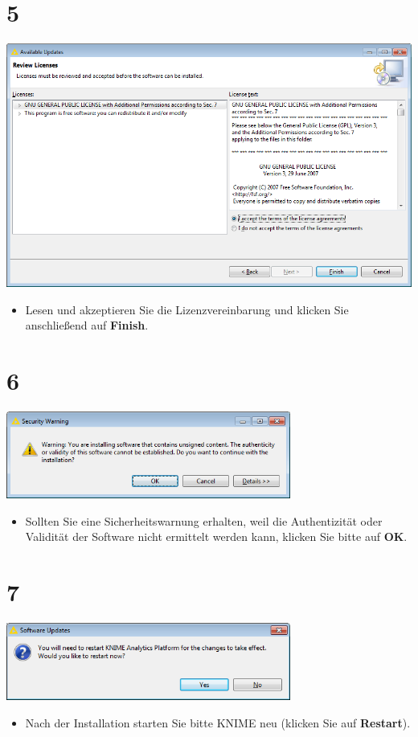 \documentclass{beamer}
\begin{document}
\section{5}
\begin{frame}
	\begin{center}
  		\includegraphics[height=0.6\textheight]{5.png}
	\end{center}
	\begin{itemize}
		\item Lesen und akzeptieren Sie die Lizenzvereinbarung und klicken Sie anschließend auf \textbf{Finish}.
	\end{itemize}
\end{frame}

\section{6}
\begin{frame}
	\begin{center}
  		\includegraphics[width=0.7\textwidth]{6.png}
	\end{center}
	\begin{itemize}
		\item Sollten Sie eine Sicherheitswarnung erhalten, weil die Authentizität oder Validität der Software nicht ermittelt werden kann, klicken Sie bitte auf \textbf{OK}.
	\end{itemize}
\end{frame}

\section{7}
\begin{frame}
	\begin{center}
  		\includegraphics[width=0.7\textwidth]{7.png}
	\end{center}
	\begin{itemize}
		\item Nach der Installation starten Sie bitte KNIME neu (klicken Sie auf \textbf{Restart}).
	\end{itemize}
\end{frame}
\end{document}
